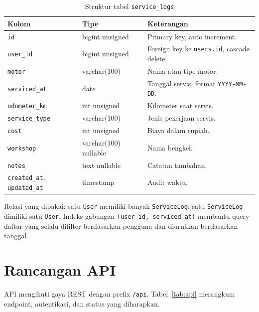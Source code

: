 \documentclass[12pt,a4paper,oneside]{book}
\begin{document}
\begin{table}[H]
\centering
\caption{Struktur tabel \texttt{service\_logs}}
\label{tab:servicelogs}
\begin{tabularx}{\textwidth}{@{}l l X@{}}
\toprule
\textbf{Kolom} & \textbf{Tipe} & \textbf{Keterangan} \\
\midrule
\texttt{id} & bigint unsigned & Primary key, auto increment. \\
\texttt{user\_id} & bigint unsigned & Foreign key ke \texttt{users.id}, cascade delete. \\
\texttt{motor} & varchar(100) & Nama atau tipe motor. \\
\texttt{serviced\_at} & date & Tanggal servis, format \texttt{YYYY-MM-DD}. \\
\texttt{odometer\_km} & int unsigned & Kilometer saat servis. \\
\texttt{service\_type} & varchar(100) & Jenis pekerjaan servis. \\
\texttt{cost} & int unsigned & Biaya dalam rupiah. \\
\texttt{workshop} & varchar(100) nullable & Nama bengkel. \\
\texttt{notes} & text nullable & Catatan tambahan. \\
\texttt{created\_at}, \texttt{updated\_at} & timestamp & Audit waktu. \\
\bottomrule
\end{tabularx}
\end{table}

Relasi yang dipakai: satu \texttt{User} memiliki banyak \texttt{ServiceLog};
satu \texttt{ServiceLog} dimiliki satu \texttt{User}. Indeks gabungan
\texttt{(user\_id, serviced\_at)} membantu query daftar yang selalu difilter
berdasarkan pengguna dan diurutkan berdasarkan tanggal.

\section{Rancangan API}

API mengikuti gaya REST dengan prefix \texttt{/api}. Tabel~\ref{tab:api}
merangkum endpoint, autentikasi, dan status yang diharapkan.
\end{document}
